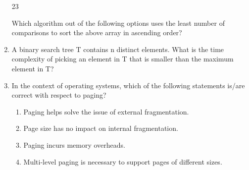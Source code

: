 \documentclass[a4paper, 11pt]{article}
\begin{document}
\begin{enumerate}
    \begin{center}
        23       
    \end{center}
    Which algorithm out of the following options uses the least number of comparisons  to sort the above array in ascending order?
    \begin{enumerate}
    \end{enumerate}
    \hfill{}
    
    \item A binary search tree T contains n distinct elements. What is the time complexity of picking an element in T that is smaller than the maximum element in T?
    \begin{enumerate}
    \end{enumerate}
    \hfill{}

    \item In the context of operating systems, which of the following statements is/are correct with respect to paging?
    \begin{enumerate}
        \item Paging helps solve the issue of external fragmentation.
        \item Page size has no impact on internal fragmentation.
        \item Paging incurs memory overheads.
        \item Multi-level paging is necessary to support pages of different sizes.
    \end{enumerate}
    \hfill{}
    

\end{enumerate}
\end{document}

